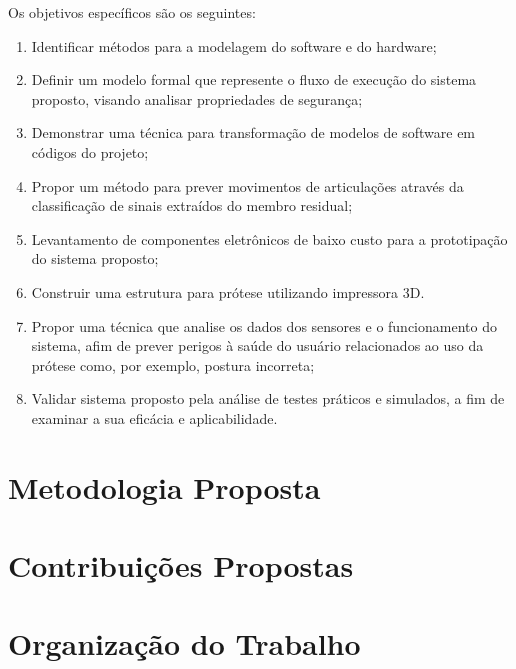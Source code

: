 
Os objetivos específicos são os seguintes:
\begin{enumerate}
  \item Identificar métodos para a modelagem do software e do hardware;
  \item Definir um modelo formal que represente o fluxo de execução do sistema proposto, visando analisar propriedades de segurança;
  \item Demonstrar uma técnica para transformação de modelos de software em códigos do projeto;
  \item Propor um método para prever movimentos de articulações através da classificação de sinais extraídos do membro residual;%
  \item Levantamento de componentes eletrônicos de baixo custo para a prototipação do sistema proposto;
  \item Construir uma estrutura para prótese utilizando impressora 3D.
  \item Propor uma técnica que analise os dados dos sensores e o funcionamento do sistema, afim de prever perigos à saúde do usuário relacionados ao uso da prótese como, por exemplo, postura incorreta;
  \item Validar sistema proposto pela análise de testes práticos e simulados, a fim de examinar a sua eficácia e aplicabilidade.
\end{enumerate}

\section{Metodologia Proposta}
\label{sec:metodologia}

\section{Contribuições Propostas}
\label{sec:contribuicoes}

\section{Organização do Trabalho}
\label{sec:organizacao}
